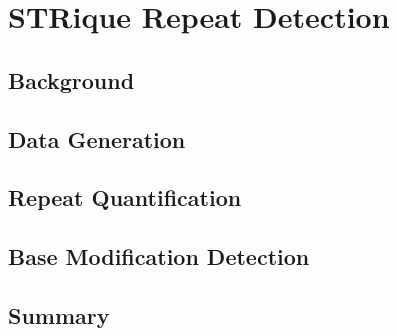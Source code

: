 \chapter{STRique Repeat Detection}
\label{sec:strique}

\section{Background}
\label{sec:strique:background}

\section{Data Generation}
\label{sec:strique:data}

\section{Repeat Quantification}
\label{sec:strique:quantification}

\section{Base Modification Detection}
\label{sec:strique:modifications}

\section{Summary}
\label{sec:strique:summary}
